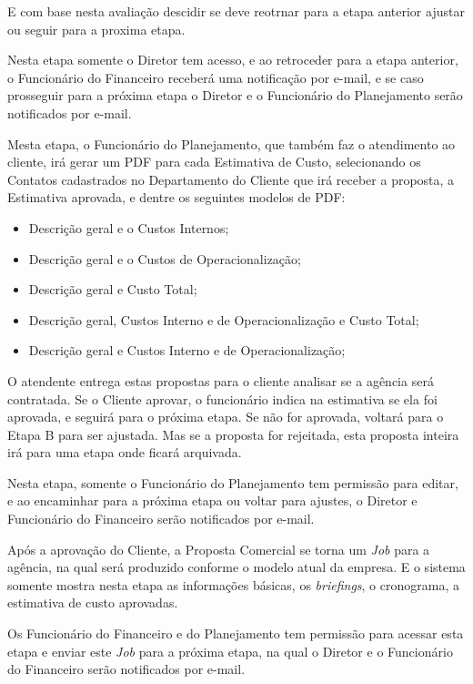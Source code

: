 \documentclass[
  12pt,				%
  openany,
  oneside,
  a4paper,			%
  english,			%
  brazil
]{article}
\numberwithin{figure}{section}
\numberwithin{table}{section}
\newcounter{subsubsubsection}[subsubsection]
\begin{document}
E com base nesta avaliação descidir se deve reotrnar para a etapa anterior ajustar ou seguir para a proxima etapa.

Nesta etapa somente o Diretor tem acesso, e ao retroceder para a etapa anterior, o Funcionário do Financeiro receberá uma notificação por e-mail, e se caso prosseguir para a próxima etapa o Diretor e o Funcionário do Planejamento serão notificados por e-mail.



Mesta etapa, o Funcionário do Planejamento, que também faz o atendimento ao cliente, irá gerar um PDF para cada Estimativa de Custo, selecionando os Contatos cadastrados no Departamento do Cliente que irá receber a proposta, a Estimativa aprovada, e dentre os seguintes modelos de PDF:

\begin{itemize}
	\item Descrição geral e o Custos Internos;
	\item Descrição geral e o Custos de Operacionalização;
	\item Descrição geral e Custo Total;
	\item Descrição geral, Custos Interno e de Operacionalização e Custo Total;
	\item Descrição geral e Custos Interno e de Operacionalização;
\end{itemize}

O atendente entrega estas propostas para o cliente analisar se a agência será contratada. Se o Cliente aprovar, o funcionário indica na estimativa se ela foi aprovada, e seguirá para o próxima etapa. Se não for aprovada, voltará para o Etapa B para ser ajustada. Mas se a proposta for rejeitada, esta proposta inteira irá para uma etapa onde ficará arquivada.

Nesta etapa, somente o Funcionário do Planejamento tem permissão para editar, e ao encaminhar para a próxima etapa ou voltar para ajustes, o Diretor e Funcionário do Financeiro serão notificados por e-mail.



Após a aprovação do Cliente, a Proposta Comercial se torna um \textit{Job} para a agência, na qual será produzido conforme o modelo atual da empresa. E o sistema somente mostra nesta etapa as informações básicas, os \textit{briefings}, o cronograma, a estimativa de custo aprovadas.

Os Funcionário do Financeiro e do Planejamento tem permissão para acessar esta etapa e enviar este \textit{Job} para a próxima etapa, na qual o Diretor e o Funcionário do Financeiro serão notificados por e-mail.
\end{document}
